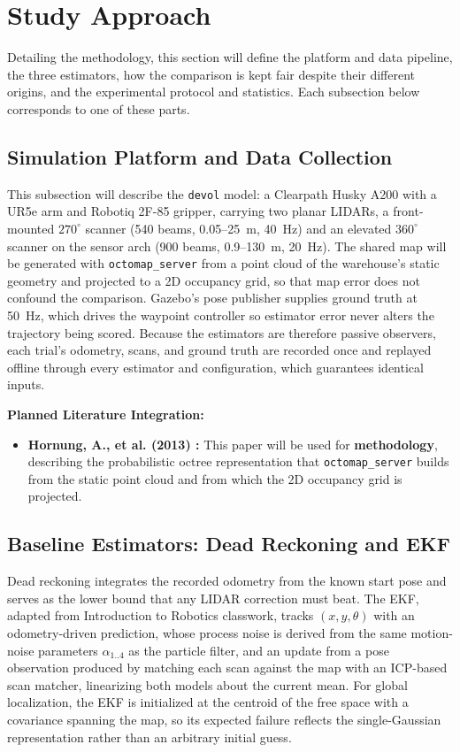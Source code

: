 \documentclass[conf]{new-aiaa}
\begin{document}
\section{Study Approach}\label{sec:Study-Approach}
Detailing the methodology, this section will define the platform and data pipeline, the three estimators, how the comparison is kept fair despite their different origins, and the experimental protocol and statistics. Each subsection below corresponds to one of these parts.

\subsection{Simulation Platform and Data Collection}\label{sec:Platform}
This subsection will describe the \texttt{devol} model: a Clearpath Husky A200 with a UR5e arm and Robotiq 2F-85 gripper, carrying two planar LIDARs, a front-mounted $270^\circ$ scanner (540 beams, 0.05--25~m, 40~Hz) and an elevated $360^\circ$ scanner on the sensor arch (900 beams, 0.9--130~m, 20~Hz). The shared map will be generated with \texttt{octomap\_server} from a point cloud of the warehouse's static geometry and projected to a 2D occupancy grid, so that map error does not confound the comparison. Gazebo's pose publisher supplies ground truth at 50~Hz, which drives the waypoint controller so estimator error never alters the trajectory being scored. Because the estimators are therefore passive observers, each trial's odometry, scans, and ground truth are recorded once and replayed offline through every estimator and configuration, which guarantees identical inputs.

\vspace{0.5em}\noindent\textbf{Planned Literature Integration:}
\begin{itemize}
    \item \textbf{Hornung, A., et al. (2013) \cite{hornung2013octomap}:} This paper will be used for \textbf{methodology}, describing the probabilistic octree representation that \texttt{octomap\_server} builds from the static point cloud and from which the 2D occupancy grid is projected.
\end{itemize}

\subsection{Baseline Estimators: Dead Reckoning and EKF}\label{sec:Baselines}
Dead reckoning integrates the recorded odometry from the known start pose and serves as the lower bound that any LIDAR correction must beat. The EKF, adapted from Introduction to Robotics classwork, tracks $(x, y, \theta)$ with an odometry-driven prediction, whose process noise is derived from the same motion-noise parameters $\alpha_{1..4}$ as the particle filter, and an update from a pose observation produced by matching each scan against the map with an ICP-based scan matcher, linearizing both models about the current mean. For global localization, the EKF is initialized at the centroid of the free space with a covariance spanning the map, so its expected failure reflects the single-Gaussian representation rather than an arbitrary initial guess.
\end{document}

